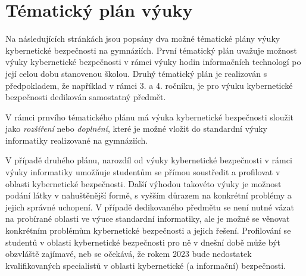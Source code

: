\documentclass[a4paper, 12pt]{article}
\begin{document}

\newpage
\section{Tématický plán výuky}
Na následujících stránkách jsou popsány dva možné tématické plány výuky kybernetické bezpečnosti na gymnáziích. První tématický plán uvažuje možnost výuky kybernetické bezpečnosti v rámci výuky hodin informačních technologí po její celou dobu stanovenou školou. Druhý tématický plán je realizován s předpokladem, že například v rámci 3. a 4. ročníku, je pro výuku kybernetické bezpečnosti dedikován samostatný předmět.

V rámci prnvího tématického plánu má výuka kybernetické bezpečnosti sloužit jako \textit{rozšíření} nebo \textit{doplnění}, které je možné vložit do standardní výuky informatiky realizované na gymnáziích. 

V případě druhého plánu, narozdíl od výuky kybernetické bezpečnosti v rámci výuky informatiky umožňuje studentům se přímou soustředit a profilovat v oblasti kybernetické bezpečnosti. Další výhodou takovéto výuky je možnost podání látky v nahuštěnější formě, s vyšším důrazem na konkrétní problémy a jejich správné uchopení. V případě dedikovaného předmětu se není nutné vázat na probírané oblasti ve výuce standardní informatiky, ale je možné se věnovat konkrétním problémům kybernetické bezpečnosti a jejich řešení. Profilování se studentů v oblasti kybernetické bezpečnosti pro ně v dnešní době může být obzvláště zajímavé, neb se očekává, že rokem 2023 bude nedostatek kvalifikovaných specialistů v oblasti kybernetické (a informační) bezpečnosti.

\end{document}
